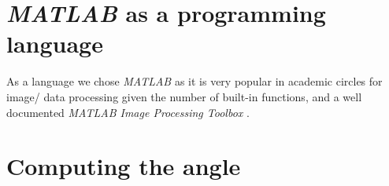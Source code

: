 \section{\textit{MATLAB} as a programming language}

As a language we chose \textit{MATLAB} as it is very popular in academic circles for image/ data processing given the number of built-in functions, and a well documented \textit{MATLAB Image Processing Toolbox} \cite{matlab}.

%




\section{Computing the angle}

